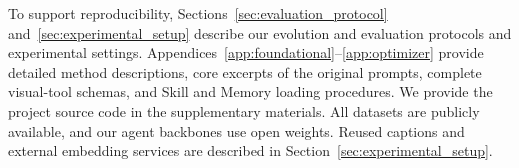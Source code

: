 \documentclass{article} %
\begin{document}
To support reproducibility, Sections~\ref{sec:evaluation_protocol} and~\ref{sec:experimental_setup} describe our evolution and evaluation protocols and experimental settings. Appendices~\ref{app:foundational}--\ref{app:optimizer} provide detailed method descriptions, core excerpts of the original prompts, complete visual-tool schemas, and Skill and Memory loading procedures. We provide the project source code in the supplementary materials. All datasets are publicly available, and our agent backbones use open weights. Reused captions and external embedding services are described in Section~\ref{sec:experimental_setup}.




\clearpage

\end{document}
